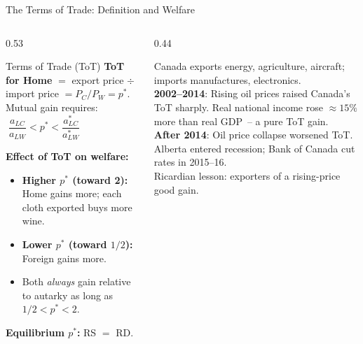 \documentclass[aspectratio=169]{beamer}
\begin{document}
\begin{frame}{The Terms of Trade: Definition and Welfare}
\begin{columns}[T]
\begin{column}{0.53\textwidth}
\begin{block}{Terms of Trade (ToT)}
\small\textbf{ToT for Home} $=$ export price $\div$
import price $= P_C/P_W = p^{*}$.\\[0.2em]
Mutual gain requires:
$\;\dfrac{a_{LC}}{a_{LW}}<p^{*}<\dfrac{a_{LC}^{*}}{a_{LW}^{*}}$
\end{block}
\vspace{0.3em}
\textbf{Effect of ToT on welfare:}
\begin{itemize}\small
  \item \textbf{Higher $p^{*}$ (toward 2):} Home gains
        more; each cloth exported buys more wine.
  \item \textbf{Lower $p^{*}$ (toward $1/2$):} Foreign
        gains more.
  \item Both \emph{always} gain relative to autarky
        as long as $1/2 < p^{*} < 2$.
\end{itemize}
\textbf{Equilibrium $p^{*}$:} RS $=$ RD.
\end{column}
\begin{column}{0.44\textwidth}
\begin{canadex}
\footnotesize Canada exports energy, agriculture,
aircraft; imports manufactures, electronics.\\[0.3em]
\textbf{2002--2014}: Rising oil prices raised Canada's
ToT sharply.  Real national income rose ${\approx}15\%$
more than real GDP~-- a pure ToT gain.\\[0.3em]
\textbf{After 2014}: Oil price collapse worsened ToT.
Alberta entered recession; Bank of Canada cut rates
in 2015--16.\\[0.2em]
Ricardian lesson: exporters of a rising-price good gain.
\end{canadex}
\end{column}
\end{columns}
\end{frame}

\end{document}
